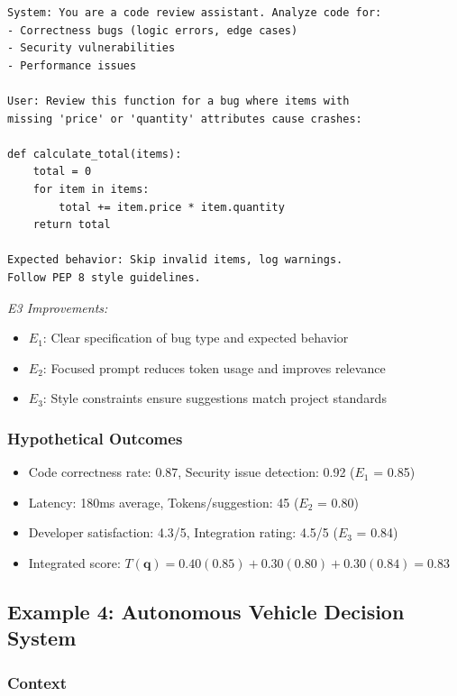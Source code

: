 \begin{verbatim}
System: You are a code review assistant. Analyze code for:
- Correctness bugs (logic errors, edge cases)
- Security vulnerabilities
- Performance issues

User: Review this function for a bug where items with 
missing 'price' or 'quantity' attributes cause crashes:

def calculate_total(items):
    total = 0
    for item in items:
        total += item.price * item.quantity
    return total

Expected behavior: Skip invalid items, log warnings.
Follow PEP 8 style guidelines.
\end{verbatim}

\textit{E3 Improvements:}
\begin{itemize}[leftmargin=2em]
    \item $E_1$: Clear specification of bug type and expected behavior
    \item $E_2$: Focused prompt reduces token usage and improves relevance
    \item $E_3$: Style constraints ensure suggestions match project standards
\end{itemize}

\subsubsection{Hypothetical Outcomes}

\begin{itemize}[leftmargin=2em]
    \item Code correctness rate: 0.87, Security issue detection: 0.92 ($E_1$ = 0.85)
    \item Latency: 180ms average, Tokens/suggestion: 45 ($E_2$ = 0.80)
    \item Developer satisfaction: 4.3/5, Integration rating: 4.5/5 ($E_3$ = 0.84)
    \item Integrated score: $T(\mathbf{q}) = 0.40(0.85) + 0.30(0.80) + 0.30(0.84) = 0.83$
\end{itemize}

\subsection{Example 4: Autonomous Vehicle Decision System}

\subsubsection{Context}

